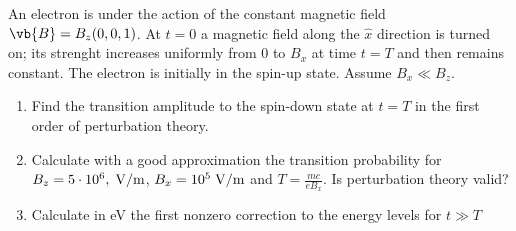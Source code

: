 \begin{esercizio}
   An electron is under the action of the constant magnetic field $\vb{B}=B_z(0,0,1)$. At $t=0$ a magnetic field along the $\hat{x}$ direction is turned on; its strenght increases uniformly from $0$ to $B_x$ at time $t=T$ and then remains constant. The electron is initially in the spin-up state. Assume $B_x \ll B_z$.
   \begin{enumerate}[label=\alph*), leftmargin=0.6cm]
      \item Find the transition amplitude to the spin-down state at $t=T$ in the first order of perturbation theory.
      \item Calculate with a good approximation the transition probability for $B_z=5 \cdot 10^6 \rm , \; V/m$, $B_x=10^5 \rm \; V/m$ and $T=\frac{mc}{e B_x}$. Is perturbation theory valid?
      \item Calculate in eV the first nonzero correction to the energy levels for $t \gg T$
   \end{enumerate}
\end{esercizio}
